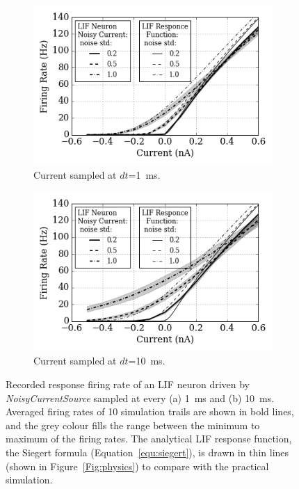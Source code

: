 	\begin{figure}[tbp!]
		\centering
		\begin{subfigure}[t]{0.49\textwidth}
			\includegraphics[width=\textwidth]{pics_iconip/2-1.png}
			\caption{Current sampled at $dt$=1~ms.}
		\end{subfigure}
		\begin{subfigure}[t]{0.49\textwidth}
			\includegraphics[width=\textwidth]{pics_iconip/2-10.png}
			\caption{Current sampled at $dt$=10~ms.}
		\end{subfigure}
		\DIFdelbeginFL %
\DIFdelendFL \DIFaddbeginFL \caption[Recorded response firing rate driven by \textit{NoisyCurrentSource}.]{\DIFaddendFL Recorded response firing rate of an LIF neuron driven by \textit{NoisyCurrentSource} \DIFaddbeginFL {}\DIFaddendFL sampled at every (a) 1~ms and (b) 10~ms. Averaged firing rates of 10 simulation trails are shown in bold lines, and the grey colour fills the range between the minimum to maximum of the firing rates. The analytical LIF response function, the Siegert formula (Equation~\ref{equ:siegert}), is drawn in thin lines (shown in Figure~\ref{Fig:physics}) to compare with the practical simulation.}
		\label{Fig:current}
	\end{figure}


